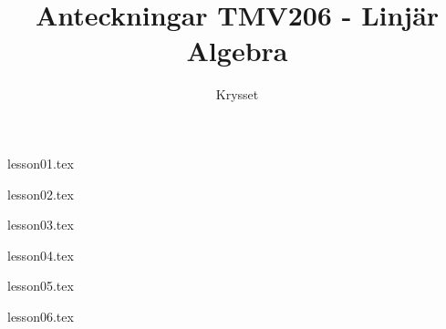 \documentclass[a4paper]{report}
\title{Anteckningar TMV206 - Linjär Algebra}
\author{Krysset}
\begin{document}
    \maketitle
    \tableofcontents


    {lesson01.tex}

    {lesson02.tex}

    {lesson03.tex}

    {lesson04.tex}

    {lesson05.tex}

    {lesson06.tex}
\end{document}
